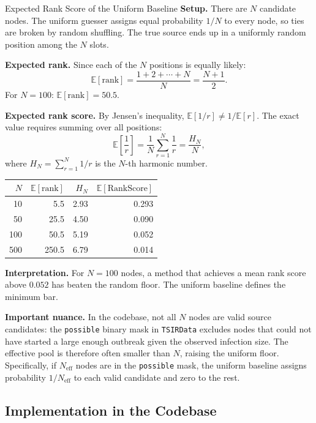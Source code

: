\begin{mathbox}{Expected Rank Score of the Uniform Baseline}
\textbf{Setup.} There are $N$ candidate nodes. The uniform guesser assigns equal
probability $1/N$ to every node, so ties are broken by random shuffling. The true
source ends up in a uniformly random position among the $N$ slots.

\textbf{Expected rank.} Since each of the $N$ positions is equally likely:
\[
  \mathbb{E}[\text{rank}] = \frac{1 + 2 + \cdots + N}{N} = \frac{N+1}{2}.
\]
For $N = 100$: $\mathbb{E}[\text{rank}] = 50.5$.

\textbf{Expected rank score.} By Jensen's inequality, $\mathbb{E}[1/r] \neq 1/\mathbb{E}[r]$.
The exact value requires summing over all positions:
\[
  \mathbb{E}\!\left[\frac{1}{r}\right]
  = \frac{1}{N} \sum_{r=1}^{N} \frac{1}{r}
  = \frac{H_N}{N},
\]
where $H_N = \sum_{r=1}^{N} 1/r$ is the $N$-th harmonic number.

\medskip
\begin{center}
\small
\begin{tabular}{rrrr}
\toprule
$N$ & $\mathbb{E}[\text{rank}]$ & $H_N$ & $\mathbb{E}[\text{RankScore}]$ \\
\midrule
10   & 5.5  & 2.93  & 0.293 \\
50   & 25.5 & 4.50  & 0.090 \\
100  & 50.5 & 5.19  & 0.052 \\
500  & 250.5 & 6.79 & 0.014 \\
\bottomrule
\end{tabular}
\end{center}

\medskip
\textbf{Interpretation.} For $N = 100$ nodes, a method that achieves a mean rank score
above $0.052$ has beaten the random floor. The uniform baseline defines the minimum bar.

\textbf{Important nuance.} In the codebase, not all $N$ nodes are valid source
candidates: the \texttt{possible} binary mask in \texttt{TSIRData} excludes nodes that
could not have started a large enough outbreak given the observed infection size. The
effective pool is therefore often smaller than $N$, raising the uniform floor.
Specifically, if $N_{\text{eff}}$ nodes are in the \texttt{possible} mask, the uniform
baseline assigns probability $1/N_{\text{eff}}$ to each valid candidate and zero to
the rest.
\end{mathbox}

\subsection{Implementation in the Codebase}

